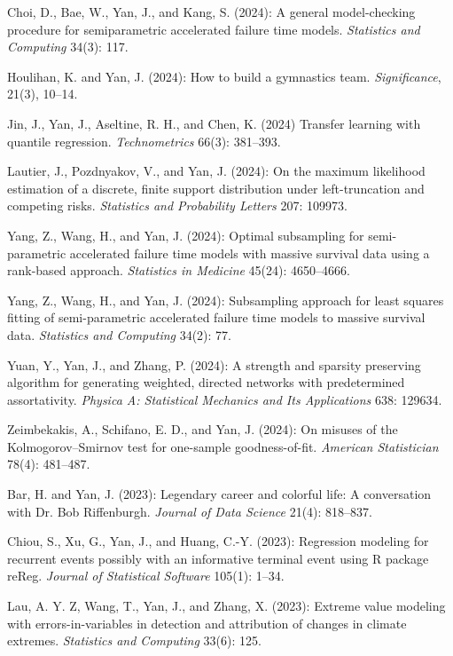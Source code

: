 \documentclass[Statistics]{vita}
\begin{document}
\begin{vita}
\begin{Publications}
\begin{RefereedJournalArticles}
  \item Choi, D., Bae, W., Yan, J., and Kang, S. (2024): A general model-checking procedure for semiparametric accelerated failure time models. {\em Statistics and Computing\/} 34(3): 117.
  \item *Houlihan, K. and Yan, J. (2024): How to build a gymnastics team. {\em Significance\/}, 21(3), 10--14. 
  \item *Jin, J., Yan, J., Aseltine, R. H., and Chen, K. (2024) Transfer learning with quantile regression. {\em Technometrics\/} 66(3): 381--393.
  \item *Lautier, J., Pozdnyakov, V., and Yan, J. (2024): On the maximum likelihood estimation of a discrete, finite support distribution under left-truncation and competing risks. {\em Statistics and Probability Letters\/} 207: 109973.
  \item *Yang, Z., Wang, H., and Yan, J. (2024): Optimal subsampling for semi-parametric accelerated failure time models with massive survival data using a rank-based approach. {\em Statistics in Medicine\/} 45(24): 4650--4666.
  \item *Yang, Z., Wang, H., and Yan, J. (2024): Subsampling approach for least squares fitting of semi-parametric accelerated failure time models to massive survival data. {\em Statistics and Computing\/} 34(2): 77.
  \item *Yuan, Y., Yan, J., and Zhang, P. (2024): A strength and sparsity preserving algorithm for generating weighted, directed networks with predetermined assortativity. {\em Physica A: Statistical Mechanics and Its Applications\/} 638: 129634.
  \item *Zeimbekakis, A., Schifano, E. D., and Yan, J. (2024): On misuses of the Kolmogorov--Smirnov test for one-sample goodness-of-fit. {\em American Statistician\/} 78(4): 481--487.
  \item Bar, H. and Yan, J. (2023): Legendary career and colorful life: A conversation with Dr. Bob Riffenburgh. {\em Journal of Data Science\/} 21(4): 818--837.
  \item Chiou, S., Xu, G., Yan, J., and Huang, C.-Y. (2023): Regression modeling for recurrent events possibly with an informative terminal event using R package {reReg}. {\em Journal of Statistical Software\/} 105(1): 1--34.
  \item *Lau, A. Y. Z, Wang, T., Yan, J., and Zhang, X. (2023): Extreme value modeling with errors-in-variables in detection and attribution of changes in climate extremes. {\em Statistics and Computing\/} 33(6): 125.

\end{RefereedJournalArticles}
\end{Publications}
\end{vita}
\end{document}
